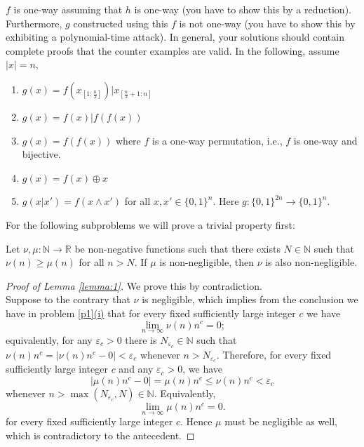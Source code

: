 \begin{problem}
$f$ is one-way assuming that $h$ is one-way (you have to show this by a reduction). 
Furthermore, $g$ constructed using this $f$ is not one-way (you have to show this by exhibiting a polynomial-time attack). 
In general, your solutions should contain complete proofs that the counter examples are valid.
In the following, assume $|x| = n$,
\begin{enumerate}[label=(\roman*)]
    \item $g(x) = f(x_{[1:\frac{n}{2}]})|x_{[\frac{n}{2}+1:n]}$
    \item $g(x) = f(x)|f(f(x))$
    \item $g(x) = f(f(x))$ where $f$ is a one-way permutation, i.e., $f$ is one-way and bijective.
    \item $g(x)=f(x)\oplus x$
    \item $g(x|x') = f(x \land x')$ for all $x,x'\in \{0,1\}^n$. Here $g:\{0,1\}^{2n}\to \{0,1\}^n$.
\end{enumerate}
\end{problem}
    For the following subproblems we will prove a trivial property first:
    \begin{lemma}\label{lemma:1}
        Let $\nu,\mu:\mathbb{N}\to \mathbb{R}$ be non-negative functions such that there exists $N\in\mathbb{N}$ such that $\nu(n)\ge \mu(n)$ for all $n\gt N$. If $\mu$ is non-negligible, then $\nu$ is also non-negligible.
    \end{lemma}
    \begin{proof}[Proof of Lemma \ref{lemma:1}]
        We prove this by contradiction.\\
        Suppose to the contrary that $\nu$ is negligible, which implies from the conclusion we have in problem \ref{p1}\hyperref[pf:1-i]{(i)} that for every fixed sufficiently large integer $c$ we have
        \[
        \lim\limits_{n\to\infty} \nu(n)n^{c}=0;
        \]
        equivalently, for any $\varepsilon_c\gt 0$ there is $N_{\varepsilon_c}\in\mathbb{N}$ such that $\nu(n)n^{c}=|\nu(n)n^{c}-0|\lt \varepsilon_c$ whenever $n\gt N_{\varepsilon_c}$.
        Therefore, for every fixed sufficiently large integer $c$ and any $\varepsilon_c\gt 0$, we have
        \[
        |\mu(n)n^c-0|=\mu(n)n^c\le \nu(n)n^c\lt \varepsilon_c
        \]
        whenever $n\gt \max(N_{\varepsilon_c}, N)\in\mathbb{N}$. Equivalently,
        \[
        \lim\limits_{n\to\infty} \mu(n)n^{c}=0.
        \]
        for every fixed sufficiently large integer $c$. Hence $\mu$ must be negligible as well, which is contradictory to the antecedent.
    \end{proof}
